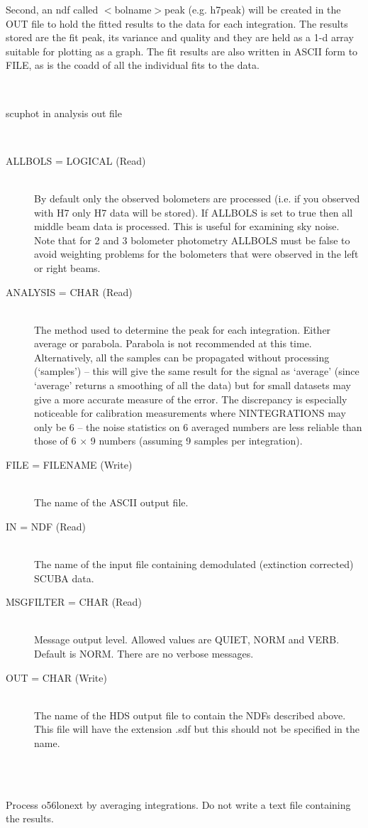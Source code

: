 \documentclass[twoside,11pt]{article}
\renewcommand{\_}{\texttt{\symbol{95}}}
\newlength{\sstexampleslength}
\newcommand{\sstusage}[1]{\item[Usage:] \mbox{}
\\[1.3ex]{\raggedright \ssttt #1}}
\newcommand{\sstparameters}[1]{
   \item[Parameters:] \mbox{} \\
   \vspace{-3.5ex}
   \begin{description}
      #1
   \end{description}
}
\newcommand{\sstexamples}[1]{
   \item[Examples:] \mbox{} \\
   \vspace{-3.5ex}
   \begin{description}
      #1
   \end{description}
}
\newcommand{\sstsubsection}[1]{ \item[{#1}] \mbox{} \\}
\newcommand{\sstexamplesubsection}[2]{\sloppy
\item[\parbox{\sstexampleslength}{\ssttt #1}] \mbox{} \vspace{1.0ex}
\\ #2 }
\newcommand{\sstnotes}[1]{\item[Notes:] \mbox{} \\[1.3ex] #1}
\newcommand{\sstitemlist}[1]{
  \mbox{} \\
  \vspace{-3.5ex}
  \begin{itemize}
     #1
  \end{itemize}
}
\newcommand{\sstitem}{\item}
\newcommand{\sstusage}[1]{\item[Usage:]
      \begin{description}
         {\ssttt #1}
      \end{description}
      \\
   }
\newcommand{\sstparameters}[1]{
      \item[Parameters:] \\
      \begin{description}
         #1
      \end{description}
      \\
   }
\newcommand{\sstexamples}[1]{
      \item[Examples:] \\
      \begin{description}
         #1
      \end{description}
      \\
   }
\newcommand{\sstsubsection}[1]{\item[{#1}]}
\newcommand{\sstexamplesubsection}[2]{\item[{\ssttt #1}] #2}
\newcommand{\sstnotes}[1]{\item[Notes:] #1 }
\newcommand{\sstitemlist}[1]{
      \begin{itemize}
         #1
      \end{itemize}
      \\
   }
\newcommand{\sstitem}{\item}
\begin{document}
{{{         \sstitem
          Second, an ndf called $<$bolname$>$\_peak (e.g. h7\_peak) will be created
            in the OUT file to hold the fitted results to the data for each
            integration. The results stored are the fit peak, its variance and
            quality and they are held as a 1-d array suitable for plotting as
            a graph. The fit results are also written in ASCII form to FILE, as
            is the coadd of all the individual fits to the data.
      }
   }
   \sstusage{
      scuphot in analysis out file
   }
   \sstparameters{
      \sstsubsection{
         ALLBOLS = LOGICAL (Read)
      }{
         By default only the observed bolometers are processed (i.e. if you
         observed with H7 only H7 data will be stored). If ALLBOLS is set
         to true then all middle beam data is processed. This is useful
         for examining sky noise. Note that for 2 and 3 bolometer photometry
         ALLBOLS must be false to avoid weighting problems for the
         bolometers that were observed in the left or right beams.
      }
      \sstsubsection{
         ANALYSIS = CHAR (Read)
      }{
         The method used to determine the peak for each integration.  
  	 Either average or parabola.
         Parabola is not recommended at this time. Alternatively, all the
         samples can be propagated without processing (`samples') -- 
         this will give the same result for the signal as `average' 
         (since `average' returns a smoothing of all the data) 
         but for small datasets may give a more accurate measure of the error.
         The discrepancy is especially noticeable for calibration measurements
         where N\_INTEGRATIONS may only be 6 -- the noise statistics on 6 
         averaged numbers are less reliable than those of 6 $\times$ 9 numbers
         (assuming 9 samples per integration).
      }
      \sstsubsection{
         FILE = FILENAME (Write)
      }{
         The name of the ASCII output file.
      }
      \sstsubsection{
         IN = NDF (Read)
      }{
         The name of the input file containing demodulated (extinction
         corrected) SCUBA data.
      }
      \sstsubsection{
         MSG\_FILTER = CHAR (Read)
      }{
         Message output level. Allowed values are QUIET, NORM and VERB.
         Default is NORM. There are no verbose messages.
      }
      \sstsubsection{
         OUT = CHAR (Write)
      }{
         The name of the HDS output file to contain the NDFs described above.
         This file will have the extension .sdf but this should not be
         specified in the name.
      }
   }
   \sstexamples{
      \sstexamplesubsection{
         scuphot o56\_lon\_ext average o56\_lon\_pht !
      }{
	Process o56\_lon\_ext by averaging integrations. Do not write
        a text file containing the results.
      }
   }
   \sstnotes{
      \sstitemlist{

}}}
\end{document}
